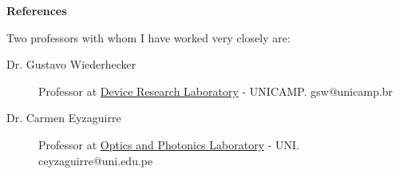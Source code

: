 \documentclass[letterpaper, 12pt]{article}[leftmargin=*]
\renewcommand{\section}[2]{
  \colorbox{secondary}{\color{white}\raggedbottom\normalsize\textbf{{#1}{\hspace{7pt}#2}}}
}
\begin{document}
\section{\faTripadvisor}{References}

\vspace{4pt}
Two professors with whom I have worked very closely are:
\vspace{-0.2cm}
\begin{description}
	\item[Dr. Gustavo Wiederhecker] Professor at \href{https://sites.ifi.unicamp.br/lpd/}{Device Research Laboratory} - UNICAMP. \href{gsw@unicamp.br}{\faEnvelopeO} gsw@unicamp.br
	\vspace{-0.15cm}
	\item[Dr. Carmen Eyzaguirre] Professor at \href{https://fc.uni.edu.pe/fc/index.php/noticias-secundarias/item/12-eyzaguirre-gorvenia-carmen}{Optics and Photonics Laboratory} - UNI. \href{ceyzaguirre@uni.edu.pe}{\faEnvelopeO} ceyzaguirre@uni.edu.pe
\end{description}
\end{document}
